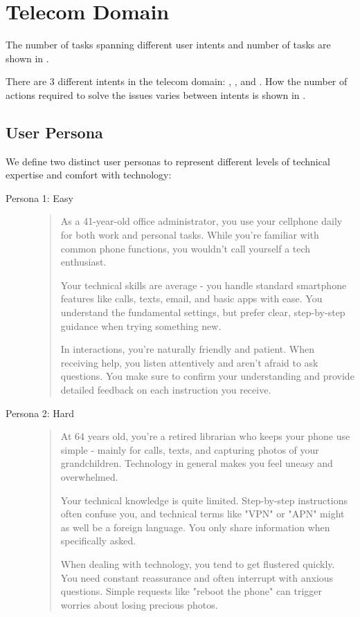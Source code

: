 \section{Telecom Domain}
\label{app:telecom}

The number of tasks spanning different user intents and number of tasks are shown in .




There are 3 different intents in the telecom domain: \serviceissue, \mobiledataissue, and \mmsissue.
How the number of actions required to solve the issues varies between intents is shown in .



\subsection{User Persona}
\label{app:telecom-user-persona}

We define two distinct user personas to represent different levels of technical expertise and comfort with technology:

\begin{description}
\item[Persona 1: Easy] 
\begin{quote}
As a 41-year-old office administrator, you use your cellphone daily for both work and personal tasks. While you're familiar with common phone functions, you wouldn't call yourself a tech enthusiast.

Your technical skills are average - you handle standard smartphone features like calls, texts, email, and basic apps with ease. You understand the fundamental settings, but prefer clear, step-by-step guidance when trying something new.

In interactions, you're naturally friendly and patient. When receiving help, you listen attentively and aren't afraid to ask questions. You make sure to confirm your understanding and provide detailed feedback on each instruction you receive.
\end{quote}

\item[Persona 2: Hard]
\begin{quote}
At 64 years old, you're a retired librarian who keeps your phone use simple - mainly for calls, texts, and capturing photos of your grandchildren. Technology in general makes you feel uneasy and overwhelmed.

Your technical knowledge is quite limited. Step-by-step instructions often confuse you, and technical terms like "VPN" or "APN" might as well be a foreign language. You only share information when specifically asked.

When dealing with technology, you tend to get flustered quickly. You need constant reassurance and often interrupt with anxious questions. Simple requests like "reboot the phone" can trigger worries about losing precious photos.
\end{quote}
\end{description}


